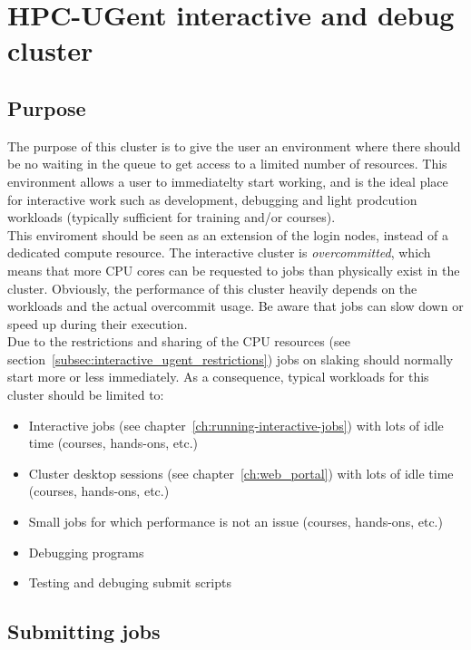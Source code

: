 \chapter{HPC-UGent interactive and debug cluster}
\label{ch:interactive_ugent}


\section{Purpose}
\label{sec:interactive_ugent_pupose}
The purpose of this cluster is to give the user an environment where
there should be no waiting in the queue to get access to a limited
number of resources. This environment allows a user to immediatelty
start working, and is the ideal place for interactive work such as
development, debugging and light prodcution workloads (typically sufficient
for training and/or courses). \\ This enviroment should be seen as an
extension of the login nodes, instead of a dedicated compute resource.
The interactive cluster is \emph{overcommitted}, which means that more CPU cores can be
requested to jobs than physically exist in the cluster. Obviously, the performance of this cluster
heavily depends on the workloads and the actual overcommit usage. Be aware that jobs can slow
down or speed up during their execution.
 \\
Due to the restrictions and sharing of the CPU resources (see section~\ref{subsec:interactive_ugent_restrictions}) 
jobs on slaking should normally start more or less immediately. As a consequence,
typical workloads for this cluster should be limited to:
\begin{itemize}
  \item  Interactive jobs (see chapter~\ref{ch:running-interactive-jobs}) with lots of idle time
         (courses, hands-ons, etc.) 
  \item  Cluster desktop sessions (see chapter~\ref{ch:web_portal}) with lots of idle time
         (courses, hands-ons, etc.)
  \item  Small jobs for which performance is not an issue (courses, hands-ons, etc.)
  \item  Debugging programs
  \item  Testing and debuging submit scripts
\end{itemize} 

\section{Submitting jobs}
\label{sec:interactive_ugent_jobs}

